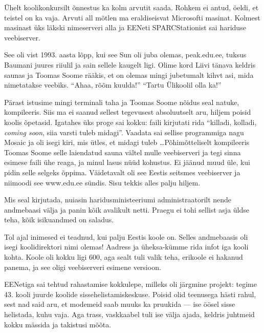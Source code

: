 Ühelt koolikonkursilt õnnestus ka kolm arvutit saada. Rohkem ei antud, 
öeldi, et teistel on ka vaja. Arvuti all mõtlen ma eraldiseisvat 
Microsofti masinat. Kolmest masinast üks läkski nimeserveri alla ja 
EENeti SPARCStationist sai hariduse veebiserver. 

See oli vist 1993. aasta lõpp, kui see Sun oli juba olemas, 
peak.edu.ee, tuksus Baumani juures riiulil ja 
sain sellele kaugelt ligi. Olime kord Liivi tänava keldris saunas ja Toomas Soome 
rääkis, et on olemas mingi jubetumalt kihvt asi, mida nimetatakse veebiks. 
\enquote{Ahaa, rõõm kuulda!} \enquote{Tartu Ülikoolil olla ka!} 

Pärast istusime mingi terminali taha ja Toomas Soome nõidus seal 
natuke, kompileeris. Siis ma ei saanud sellest tegevusest absoluutselt aru, hiljem
poisid koolis õpetasid. Igatahes üks proge sai 
kokku: faili kirjutati rida \enquote{killadi, kolladi, 
\emph{coming soon}, siia varsti tuleb midagi}. Vaadata sai sellise
programmiga nagu Mosaic ja oli isegi kiri, mis 
ütles, et midagi tuleb \ldots Põhimõtteliselt kompileeris Toomas Soome selle laiendatud 
sauna vältel mulle veebiserveri ja tegi sinna esimese faili ühe 
reaga, ja minul lasus nüüd kohustus. Ei jäänud muud üle, kui pidin selle 
selgeks õppima. Väidetavalt oli see Eestis seitsmes veebiserver ja 
niimoodi see www.edu.ee sündis. Sisu tekkis alles palju 
hiljem.


Mis seal kirjutada, nuiasin haridusministeeriumi 
administraatorilt nende andmebaasi välja ja panin kõik avalikult netti. Praegu ei tohi sellist asja üldse teha, kõik isikuandmed on 
saladus.


Tol ajal inimesed ei teadnud, kui palju Eestis koole on. Selles andmebaasis 
oli isegi koolidirektori nimi olemas! Aadress ja üheksa-kümme rida 
infot iga kooli kohta. Koole oli kokku ligi 600, aga sealt tuli valik 
teha, erikoole ei hakanud panema, ja see oligi veebiserveri esimene 
versioon. 

EENetiga sai
tehtud rahastamise kokkulepe, milleks oli järgmine projekt: tegime
43. kooli juurde koolide 
sissehelistamiskeskuse. Poisid olid teenusega hästi rahul, sest nad said 
aru, et modemeid saab muuks ka pruukida --- ise öösel sisse helistada, 
kuhu vaja. Aga trass, vaskkaabel tuli ise välja ajada, 
keldris juhtmeid kokku mässida ja takistusi mõõta. 

